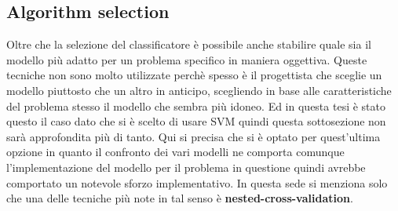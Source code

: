 \subsection{Algorithm selection}
Oltre che la selezione del classificatore è possibile anche stabilire quale sia il modello più adatto per un problema specifico in maniera oggettiva. Queste tecniche non sono molto utilizzate perchè spesso è il progettista che sceglie un modello piuttosto che un altro in anticipo, scegliendo in base alle caratteristiche del problema stesso il modello che sembra più idoneo. Ed in questa tesi è stato questo il caso dato che si è scelto di usare \ac{SVM} quindi questa sottosezione non sarà approfondita più di tanto. Qui si precisa che si è optato per quest'ultima opzione in quanto il confronto dei vari modelli ne comporta comunque l'implementazione del modello per il problema in questione quindi avrebbe  comportato un notevole sforzo implementativo. In questa sede si menziona solo che una delle tecniche più note in tal senso è \textbf{nested-cross-validation}.

